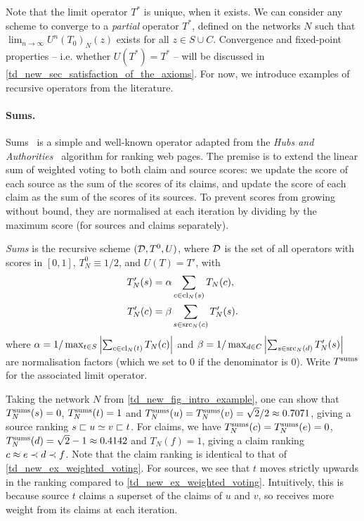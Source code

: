Note that the limit operator $T^*$ is unique, when it exists. We can consider
any scheme to converge to a \emph{partial} operator $T^*$, defined on the
networks $N$ such that $\lim_{n \to \infty}{U^n(T_0)_N(z)}$ exists for all $z
\in S \cup C$. Convergence and fixed-point properties -- i.e. whether $U(T^*) =
T^*$ -- will be discussed in \cref{td_new_sec_satisfaction_of_the_axioms}. For
now, we introduce examples of recursive operators from the literature.

\paragraph{Sums.}

Sums~\cite{pasternack2010} is a simple and well-known operator adapted from the
\emph{Hubs and Authorities}~\cite{kleinberg1999} algorithm for ranking web
pages. The premise is to extend the linear sum of weighted voting to both claim
and source scores: we update the score of each source as the sum of the scores
of its claims, and update the score of each claim as the sum of the scores of
its sources. To prevent scores from growing without bound, they are normalised
at each iteration by dividing by the maximum score (for sources and claims
separately).

\begin{definition}
    \label{td_new_def_sums}
    \emph{Sums} is the recursive scheme $(\mathcal{D}, T^0, U)$, where $\mathcal{D}$ is the set
    of all operators with scores in $[0, 1]$, $T^0_N \equiv 1 / 2$, and $U(T) =
    T'$, with
    \begin{align*}
        T'_N(s) &=
            \alpha
            \sum_{c \in \operatorname{cl}_N(s)}{
                T_N(c)
            },
        \\
        T'_N(c) &=
            \beta
            \sum_{s \in \operatorname{src}_N(c)}{
                T'_N(s)
            }.
    \end{align*}
    where $
        \alpha = 1 / \max_{t \in S}{
            \left|
                \sum_{c \in \operatorname{cl}_N(t)}{
                    T_N(c)
                }
            \right|
        }
    $ and $
        \beta = 1 / \max_{d \in C}{
            \left|
                \sum_{s \in \operatorname{src}_N(d)}{
                    T'_N(s)
                }
            \right|
        }
    $ are normalisation factors (which we set to 0 if the denominator is 0).
    Write $T^{\operatorname{sums}}$ for the associated limit operator.
\end{definition}

Taking the network $N$ from \cref{td_new_fig_intro_example}, one can show that
$T^{\operatorname{sums}}_N(s) = 0$, $T^{\operatorname{sums}}_N(t) = 1$ and $T^{\operatorname{sums}}_N(u) = T^{\operatorname{sums}}_N(v) = \sqrt{2} / 2
\approx 0.7071$, giving a source ranking $s \sqsubset u \simeq v \sqsubset t$.  For claims,
we have $T^{\operatorname{sums}}_N(c) = T^{\operatorname{sums}}_N(e) = 0$, $T^{\operatorname{sums}}_N(d) = \sqrt{2} - 1 \approx
0.4142$ and $T_N(f) = 1$, giving a claim ranking $c \approx e \prec d \prec f$. Note
that the claim ranking is identical to that of
\cref{td_new_ex_weighted_voting}. For sources, we see that $t$ moves strictly
upwards in the ranking compared to \cref{td_new_ex_weighted_voting}.
Intuitively, this is because source $t$ claims a superset of the claims of $u$
and $v$, so receives more weight from its claims at each iteration.

